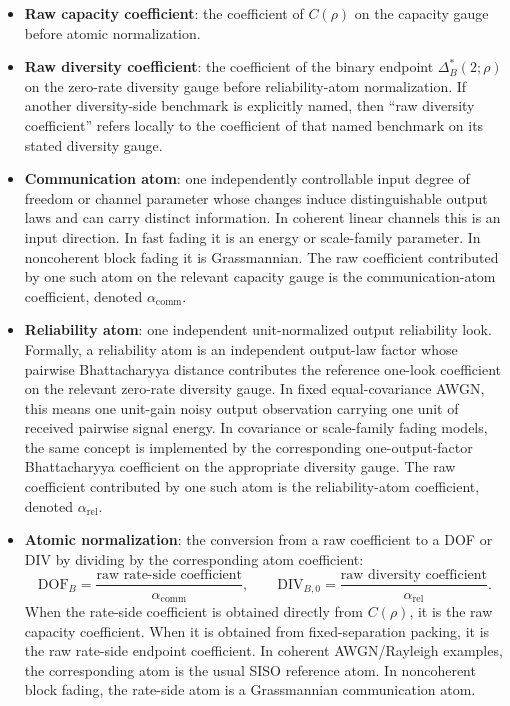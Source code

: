 \documentclass[lettersize,onecolumn]{IEEEtran}
\newcommand{\snr}{\rho}
\begin{document}
\begin{itemize}
\item \textbf{Raw capacity coefficient}: the coefficient of
$C(\snr)$ on the capacity gauge before atomic normalization.

\item \textbf{Raw diversity coefficient}: the coefficient of the
binary endpoint $\Delta_B^*(2;\snr)$ on the zero-rate diversity gauge
before reliability-atom normalization. If another diversity-side
benchmark is explicitly named, then ``raw diversity coefficient''
refers locally to the coefficient of that named benchmark on its
stated diversity gauge.

\item \textbf{Communication atom}: one independently controllable
input degree of freedom or channel parameter whose changes induce
distinguishable output laws and can carry distinct information. In
coherent linear channels this is an input direction. In fast fading
it is an energy or scale-family parameter. In noncoherent block
fading it is Grassmannian. The raw coefficient contributed by one
such atom on the relevant capacity gauge is the communication-atom
coefficient, denoted $\alpha_{\mathrm{comm}}$.

\item \textbf{Reliability atom}: one independent unit-normalized
output reliability look. Formally, a reliability atom is an
independent output-law factor whose pairwise Bhattacharyya distance
contributes the reference one-look coefficient on the relevant
zero-rate diversity gauge. In fixed equal-covariance AWGN, this means
one unit-gain noisy output observation carrying one unit of received
pairwise signal energy. In covariance or scale-family fading models,
the same concept is implemented by the corresponding
one-output-factor Bhattacharyya coefficient on the appropriate
diversity gauge. The raw coefficient contributed by one such atom is
the reliability-atom coefficient, denoted
$\alpha_{\mathrm{rel}}$.

\item \textbf{Atomic normalization}: the conversion from a raw
coefficient to a DOF or DIV by dividing by the corresponding atom
coefficient:
\[
\mathrm{DOF}_B = \frac{\text{raw rate-side coefficient}}
  {\alpha_{\mathrm{comm}}},
\qquad
\mathrm{DIV}_{B,0} = \frac{\text{raw diversity coefficient}}
  {\alpha_{\mathrm{rel}}}.
\]
When the rate-side coefficient is obtained directly from $C(\snr)$,
it is the raw capacity coefficient. When it is obtained from
fixed-separation packing, it is the raw rate-side endpoint
coefficient.
In coherent AWGN/Rayleigh examples, the corresponding atom is the
usual SISO reference atom. In noncoherent block fading, the
rate-side atom is a Grassmannian communication atom.


\end{itemize}
\end{document}
